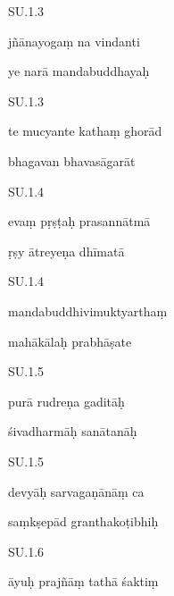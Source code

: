 \documentclass{article}
\begin{document}
    
	
	    
		SU.1.3 
    
	    
		jñānayogaṃ na vindanti 
    
	    
		ye narā mandabuddhayaḥ 
    

    
	
	    
		SU.1.3 
    
	    
		te mucyante kathaṃ ghorād 
    
	    
		bhagavan bhavasāgarāt 
    

    
	
	    
		SU.1.4 
    
	    
		evaṃ pṛṣṭaḥ prasannātmā 
    
	    
		ṛṣy ātreyeṇa dhīmatā 
    

    
	
	    
		SU.1.4 
    
	    
		mandabuddhivimuktyarthaṃ 
    
	    
		mahākālaḥ prabhāṣate 
    

    
	
	    
		SU.1.5 
    
	    
		purā rudreṇa gaditāḥ 
    
	    
		śivadharmāḥ sanātanāḥ 
    

    
	
	    
		SU.1.5 
    
	    
		devyāḥ sarvagaṇānāṃ ca 
    
	    
		saṃkṣepād granthakoṭibhiḥ 
    

    
	
	    
		SU.1.6 
    
	    
		āyuḥ prajñāṃ tathā śaktiṃ 
    
\end{document}
